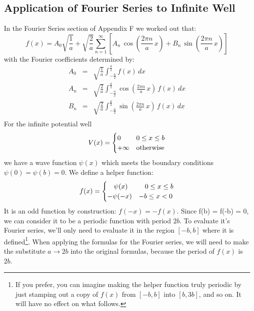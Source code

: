 \documentclass[12pt]{book}
\begin{document}
\subsection{Application of Fourier Series to Infinite Well}

In the Fourier Series section of Appendix F we worked out that:
\begin{equation*}
f(x) = A_0 \sqrt{\frac{1}{a}} + \sqrt{\frac{2}{a}} \sum_{n=1}^{\infty}  \left[ A_n \, \cos\left(\frac{2\pi n}{a} \, x \right) + B_n \, \sin\left(\frac{2\pi n}{a} \, x \right)\right]\end{equation*}
with the Fourier coefficients determined by:
\begin{eqnarray*}
A_0 &=& \sqrt{\frac{1}{a}} \int_{-\frac{a}{2}}^{\frac{a}{2}} f(x) \, dx \\
A_n &=& \sqrt{\frac{2}{a}} \int_{-\frac{a}{2}}^{\frac{a}{2}} 
\cos\left(\frac{2\pi n}{a} \, x \right) \, f(x) \, dx \\
B_n &=& \sqrt{\frac{2}{a}} \int_{-\frac{a}{2}}^{\frac{a}{2}} 
\sin\left(\frac{2\pi n}{a} \, x \right) \, f(x) \, dx \\
\end{eqnarray*}
For the infinite potential well
\begin{equation}
V(x) = 
\begin{cases}    
   0 & 0 \leq x \leq b \\
   +\infty & {\rm otherwise} \\
\end{cases}   
\end{equation}
we have a wave function $\psi(x)$ which meets the boundary conditions $\psi(0) = \psi(b) = 0$.  We define a helper function:
\begin{equation*}
f(x) = 
\begin{cases}    
  \hspace{9.5pt}\psi(x)  & \hspace{9pt} 0 \leq x \leq b \\
  -\psi(-x) & -b \leq x < 0 \\
\end{cases}   
\end{equation*}
It is an odd function by construction:  $f(-x) = -f(x)$.  Since f(b) = f(-b) = 0, we can consider it to be a periodic function with period $2b$. To evaluate it's Fourier series, we'll only need to evaluate it in the region $[-b,b]$ where it is defined\footnote{If you prefer, you can imagine making the helper function truly periodic by just stamping out a copy of $f(x)$ from $[-b,b]$ into $[b,3b]$, and so on.  It will have no effect on what follows.}.  When applying the formulas for the Fourier series, we will need to make the substitute $a \to 2b$ into the original formulas, because the period of $f(x)$ is $2b$.
\end{document}
